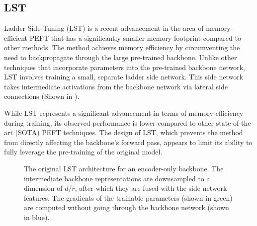 \subsection{LST}
Ladder Side-Tuning (LST) \cite{sung2022lst} is a recent advancement in the area of memory-efficient PEFT that has a significantly smaller memory footprint compared to other methods. The method achieves memory efficiency by circumventing the need to backpropagate through the large pre-trained backbone. Unlike other techniques that incorporate parameters into the pre-trained backbone network, LST involves training a small, separate ladder side network. This side network takes intermediate activations from the backbone network via lateral side connections (Shown in ).

While LST represents a significant advancement in terms of memory efficiency during training, its observed performance is lower compared to other state-of-the-art (SOTA) PEFT techniques. The design of LST, which prevents the method from directly affecting the backbone's forward pass, appears to limit its ability to fully leverage the pre-training of the original model.

\begin{figure}[h]
    \centering
    
    \caption{The original LST architecture for an encoder-only backbone. The intermediate backbone representations are downsampled to a dimension of \(d/r\), after which they are fused with the side network features. The gradients of the trainable parameters (shown in green) are computed without going through the backbone network (shown in blue).}
    \label{lst-original}
\end{figure}